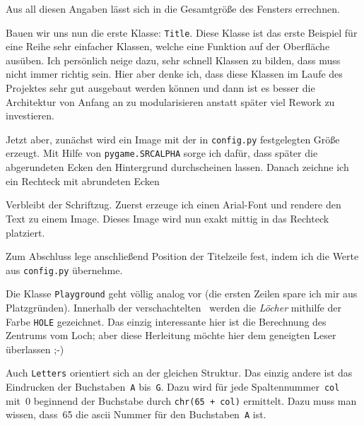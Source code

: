 Aus all diesen Angaben lässt sich in  die Gesamtgröße des Fensters errechnen. 


Bauen wir uns nun die erste Klasse: \texttt{Title}. Diese Klasse ist das erste Beispiel für eine Reihe sehr einfacher Klassen, welche eine Funktion auf der Oberfläche ausüben. Ich persönlich neige dazu, sehr schnell Klassen zu bilden, dass muss nicht immer richtig sein. Hier aber denke ich, dass diese Klassen im Laufe des Projektes sehr gut ausgebaut werden können und dann ist es besser die Architektur von Anfang an zu modularisieren anstatt später viel Rework zu investieren.

Jetzt aber, zunächst wird ein Image mit der in \texttt{config.py} festgelegten Größe erzeugt. Mit Hilfe von \texttt{pygame.SRCALPHA} sorge ich dafür, dass später die abgerundeten Ecken den Hintergrund durchscheinen lassen. Danach zeichne ich ein Rechteck mit abrundeten Ecken 

Verbleibt der Schriftzug. Zuerst erzeuge ich einen Arial-Font und rendere den Text zu einem Image. Dieses Image wird nun exakt mittig in das Rechteck platziert. 

Zum Abschluss lege anschließend Position der Titelzeile fest, indem ich die Werte aus \texttt{config.py} übernehme.


Die Klasse \texttt{Playground} geht völlig analog vor (die ersten Zeilen spare ich mir aus Platzgründen). Innerhalb der verschachtelten \forSchleife\ werden die \emph{Löcher} mithilfe der Farbe \texttt{HOLE} gezeichnet. Das einzig interessante hier ist die Berechnung des Zentrums vom Loch; aber diese Herleitung möchte hier dem geneigten Leser überlassen ;-)


Auch \texttt{Letters} orientiert sich an der gleichen Struktur. Das einzig andere ist das Eindrucken der Buchstaben~\texttt{A} bis~\texttt{G}. Dazu wird für jede Spaltennummer~\texttt{col} mit~0 beginnend der Buchstabe durch \texttt{chr(65 + col)} ermittelt. Dazu muss man wissen, dass~65 die \Gls{ascii} Nummer für den Buchstaben~\texttt{A} ist.

